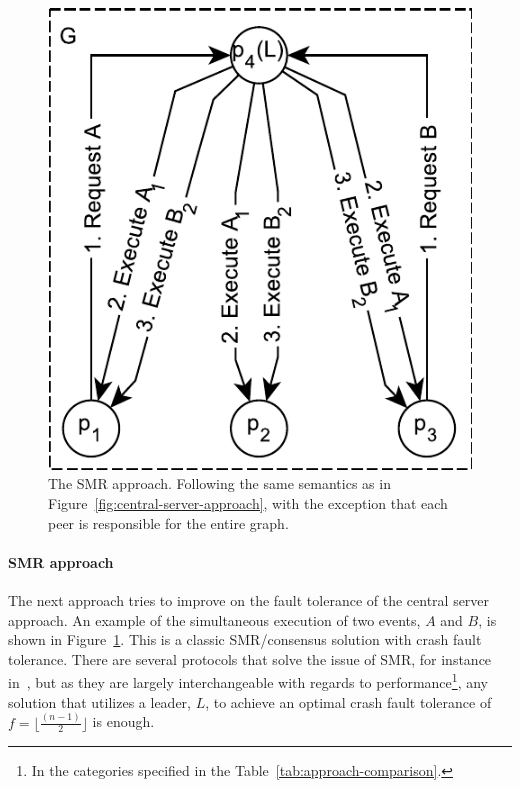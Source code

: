 \documentclass{article}
\begin{document}
    \begin{figure}[ht]
        \center
        \includegraphics[scale=0.7]{figures/dcr-graphs/smr-approach.pdf}
        \caption{The SMR approach.
        Following the same semantics as in Figure~\ref{fig:central-server-approach}, with the exception that each peer is responsible for the entire graph.}
        \label{fig:smr-approach}
    \end{figure}
    \FloatBarrier

	\paragraph{SMR approach}
	The next approach tries to improve on the fault tolerance of the central server approach.
    An example of the simultaneous execution of two events, $A$ and $B$, is shown in Figure~\ref{fig:smr-approach}.
	This is a classic SMR/consensus solution with crash fault tolerance.
	There are several protocols that solve the issue of SMR, for instance in~\cite{bracha_asynchronous_1985,lamport_part-time_1998,lamport_lower_2006,ongaro_search_2014}, but as they are largely interchangeable with regards to performance\footnote{In the categories specified in the Table~\ref{tab:approach-comparison}.}, any solution that utilizes a leader, $L$, to achieve an optimal crash fault tolerance of $f = \lfloor \frac{(n-1)}{2} \rfloor$ is enough.
\end{document}
